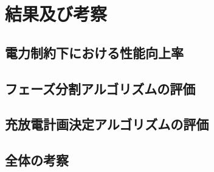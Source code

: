 \chapter{結果及び考察}
\label{chap:result}


\section{電力制約下における性能向上率}
\label{sec:speedup}

\section{フェーズ分割アルゴリズムの評価}
\label{sec:evaluate_algorithm}

\section{充放電計画決定アルゴリズムの評価}
\label{sec:evaluate_plan}

\section{全体の考察}
\label{sec:discussion}